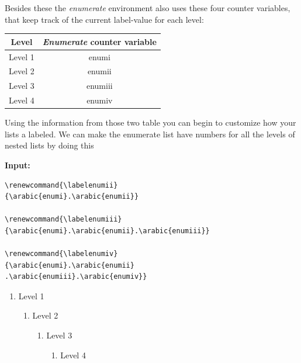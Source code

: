 \documentclass{article}
\begin{document}
Besides these the \textit{enumerate} environment also uses these four 
counter variables, that keep track of the current label-value for each level:

\begin{table}[H]
    \centering
    \begin{tabular}{|c|c|}\hline
        \rowcolor{gray!30}
        Level & \textit{Enumerate} counter variable \\ \hline
        Level 1 & enumi \\ \hline
        Level 2 & enumii \\ \hline
        Level 3 & enumiii \\ \hline
        Level 4 & enumiv \\ \hline
    \end{tabular}
\end{table}


Using the information from those two table you can begin to customize how your lists a labeled. We can make the enumerate list have numbers for all the levels of nested lists
by doing this

\begin{multicols}{2}
    \begin{minipage}{\linewidth}
        \textbf{Input:} \\
        \begin{verbatim}
\renewcommand{\labelenumii}
{\arabic{enumi}.\arabic{enumii}} 

\renewcommand{\labelenumiii}
{\arabic{enumi}.\arabic{enumii}.\arabic{enumiii}}

\renewcommand{\labelenumiv}
{\arabic{enumi}.\arabic{enumii}
.\arabic{enumiii}.\arabic{enumiv}}
        \end{verbatim}
    \end{minipage}
    \renewcommand{\labelenumii}{\arabic{enumi}.\arabic{enumii}} 
    \renewcommand{\labelenumiii}{\arabic{enumi}.\arabic{enumii}.\arabic{enumiii}}
    \renewcommand{\labelenumiv}{\arabic{enumi}.\arabic{enumii}.\arabic{enumiii}.\arabic{enumiv}}

    \begin{enumerate}
        \item Level 1
        \begin{enumerate}
            \item Level 2
            \begin{enumerate}
                \item Level 3
                \begin{enumerate}
                    \item Level 4
                \end{enumerate}
            \end{enumerate}
        \end{enumerate}
    \end{enumerate}
    \begin{minipage}{\linewidth}
        
    \end{minipage}
\end{multicols}
\end{document}
